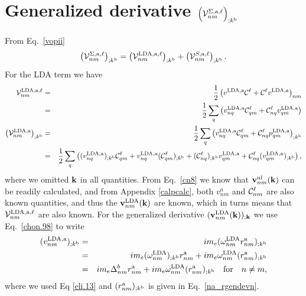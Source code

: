 \section{Generalized derivative $\Big({\cal V}^{\Sigma,\mathrm{a},\ell}_{nm}\Big)_{;k^{\mathrm{b}}}$}\label{calvs} 
From Eq.~\eqref{vopii}
\begin{eqnarray}\label{a.1}
\left(
{\mathbf{\cal V}}^{\Sigma,\mathrm{a},\ell}_{nm}
\right)_{;k^{\mathrm{b}}}
=
\left(
{\mathbf{\cal V}}^{\mathrm{LDA},\mathrm{a},\ell}_{nm}
\right)_{;k^{\mathrm{b}}}
+
\left(
{\mathbf{\cal V}}^{S,\mathrm{a},\ell}_{nm}
\right)_{;k^{\mathrm{b}}}
.
\end{eqnarray} 
For the LDA term we have
\begin{eqnarray}\label{a.2}
{\mathbf{\cal V}}^{\mathrm{LDA},\mathrm{a},\ell}_{nm}
&=&
\frac{1}{2}\left(  
v^{\mathrm{LDA},\mathrm{a}}{\mathbf{\cal C}}^\ell+{\mathbf{\cal C}}^\ell v^{\mathrm{LDA},\mathrm{a}}
\right)_{nm}
\nonumber\\
&=&
\frac{1}{2}\sum_q\left(  
v^{\mathrm{LDA},\mathrm{a}}_{nq}{\mathbf{\cal C}}^\ell_{qm}+{\mathbf{\cal C}}^\ell_{nq} v^{\mathrm{LDA},\mathrm{a}}_{qm}
\right)
\nonumber\\
\left({\mathbf{\cal V}}^{\mathrm{LDA},\mathrm{a}}_{nm}\right)_{;k^{\mathrm{b}}}
&=&
\frac{1}{2}\sum_q\left(  
v^{\mathrm{LDA},\mathrm{a}}_{nq}{\mathbf{\cal C}}^\ell_{qm}+{\mathbf{\cal C}}^\ell_{nq} p^{\mathrm{LDA},\mathrm{a}}_{qm}
\right) _{;k^{\mathrm{b}}}
\nonumber\\
&=&
\frac{1}{2}\sum_q\left(
(v^{\mathrm{LDA},\mathrm{a}}_{nq})_{;k^{\mathrm{b}}}{\mathbf{\cal C}}^\ell_{qm}
+   
v^{\mathrm{LDA},\mathrm{a}}_{nq}({\mathbf{\cal C}}^\ell_{qm})_{;k^{\mathrm{b}}}
+
({\mathbf{\cal C}}^\ell_{nq})_{;k^{\mathrm{b}}} v^{\mathrm{LDA},\mathrm{a}}_{qm}
+
{\mathbf{\cal C}}^\ell_{nq} (v^{\mathrm{LDA},\mathrm{a}}_{qm})_{;k^{\mathrm{b}}}
\right)
,
\end{eqnarray}   
where we omitted $\mathbf{k}$ in all quantities.
From Eq.~\eqref{cn8} we know that $\mathbf{v}^{\mathrm{nl}}_{nm}(\mathbf{k})$
 can be readily
calculated,
and from Appendix \ref{calpcalc}, both $v^a_{nm}$ and
${\mathbf{\cal C}}_{nm}^\ell$ are also known quantities, 
 and thus the
$\mathbf{v}^{\mathrm{LDA}}_{nm}(\mathbf{k})$ are known, which in turns means that 
${\mathbf{\cal V}}^{\mathrm{LDA},\mathrm{a},\ell}_{nm}$ are also known.
For the generalized derivative 
$(\mathbf{v}^{\mathrm{LDA}}_{nm}(\mathbf{k}))_{;\mathbf{k}}$ we use Eq.~\eqref{chon.98}
to write
\begin{eqnarray}\label{a.3}
(v^{\mathrm{LDA},\mathrm{a}}_{nm})_{;k^{\mathrm{b}}}
&=&  
im_e(\omega^{\mathrm{LDA}}_{nm}r^{\mathrm{a}}_{nm})_{;k^{\mathrm{b}}}
\nonumber\\
&=&  
im_e(\omega^{\mathrm{LDA}}_{nm})_{;k^{\mathrm{b}}} r^{\mathrm{a}}_{nm}
+  
im_e\omega^{\mathrm{LDA}}_{nm}(r^{\mathrm{a}}_{nm})_{;k^{\mathrm{b}}}
\nonumber\\
&=&  
im_e\Delta^b_{nm}r^{\mathrm{a}}_{nm}
+ 
im_e\omega^{\mathrm{LDA}}_{nm}(r^{\mathrm{a}}_{nm})_{;k^{\mathrm{b}}}
\quad\mathrm{for}\quad n\ne m
,
\end{eqnarray} 
where we used Eq \eqref{eli.13} and $(r^{\mathrm{a}}_{nm})_{;k^{\mathrm{b}}}$ is given
in Eq.~\eqref{na_rgendevn}.

